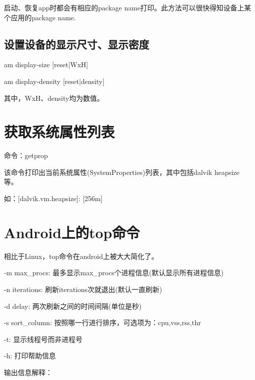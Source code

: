 ﻿\documentclass[a4paper,11pt]{article}
\begin{document}
  启动、恢复app时都会有相应的package name打印。此方法可以很快得知设备上某个应用的package name.

  \subsection[设置设备的显示尺寸、显示密度]{设置设备的显示尺寸、显示密度}
  am display-size [reset|WxH]

  am display-density [reset|density]

  其中，WxH、density均为数值。

  \section[获取系统属性列表]{获取系统属性列表}
  \hspace*{2ex}命令：getprop\par\vspace{2ex}
  该命令打印出当前系统属性(SystemProperties)列表，其中包括dalvik heapsize等。\par
  如：[dalvik.vm.heapsize]: [256m]
  
  \section[Android上的top命令]{Android上的top命令}
  相比于Linux，top命令在android上被大大简化了。
  \begin{coloredenumerate}
    \item -m max\_procs: 最多显示max\_procs个进程信息(默认显示所有进程信息)
    \item -n iterations: 刷新iterations次就退出(默认一直刷新)
    \item -d delay: 两次刷新之间的时间间隔(单位是秒)
    \item -s sort\_column: 按照哪一行进行排序，可选项为：cpu,vss,rss,thr
    \item -t: 显示线程号而非进程号
    \item -h: 打印帮助信息
  \end{coloredenumerate}
  输出信息解释：
  
\end{document}
